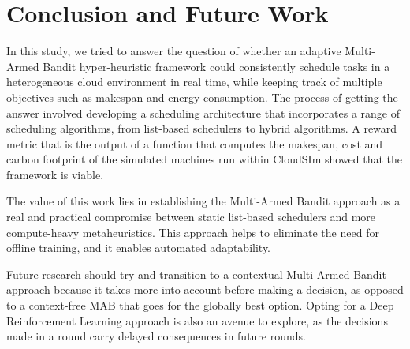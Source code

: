 \section{Conclusion and Future Work}
\label{sec:Conclusion}
In this study, we tried to answer the question of whether an adaptive Multi-Armed Bandit hyper-heuristic framework could consistently schedule tasks in a heterogeneous cloud environment in real time, while keeping track of multiple objectives such as makespan and energy consumption. The process of getting the answer involved developing a scheduling architecture that incorporates a range of scheduling algorithms, from list-based schedulers to hybrid algorithms. A reward metric that is the output of a function that computes the makespan, cost and carbon footprint of the simulated machines run within CloudSIm showed that the framework is viable.

The value of this work lies in establishing the Multi-Armed Bandit approach as a real and practical compromise between static list-based schedulers and more compute-heavy metaheuristics. This approach helps to eliminate the need for offline training, and it enables automated adaptability. 

Future research should try and transition to a contextual Multi-Armed Bandit approach because it takes more into account before making a decision, as opposed to a context-free MAB that goes for the globally best option. Opting for a Deep Reinforcement Learning approach is also an avenue to explore, as the decisions made in a round carry delayed consequences in future rounds.